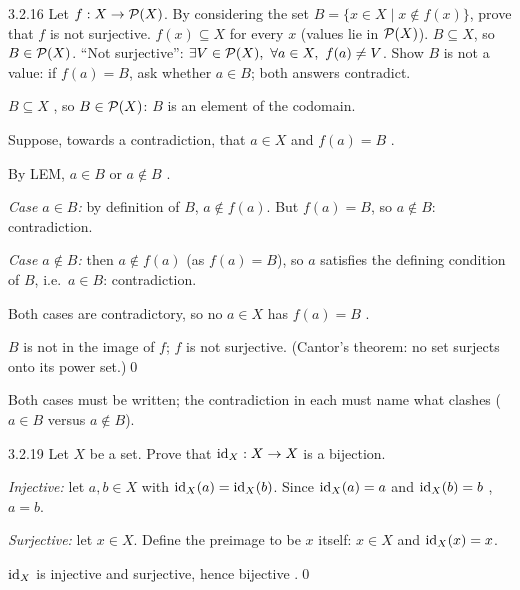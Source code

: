 \begin{bookex}[recommended]{3.2.16}
Let $f:X\to\mathcal{P}(X)$. By considering the set $B=\{x\in X\mid x\notin f(x)\}$, prove that $f$ is not surjective.
\solution
\given $f(x)\subseteq X$ for every $x$ (values lie in $\mathcal{P}(X)$). $B\subseteq X$, so $B\in\mathcal{P}(X)$. ``Not surjective'': $\exists V\in\mathcal{P}(X),\ \forall a\in X,\ f(a)\ne V$.
\plan Show $B$ is not a value: if $f(a)=B$, ask whether $a\in B$; both answers contradict.
\begin{steps}
\item $B\subseteq X$ , so $B\in\mathcal{P}(X)$: $B$ is an element of the codomain.
\item Suppose, towards a contradiction, that $a\in X$ and $f(a)=B$ .
\item By LEM, $a\in B$ or $a\notin B$ .
\item \emph{Case $a\in B$:} by definition of $B$, $a\notin f(a)$. But $f(a)=B$, so $a\notin B$: contradiction.
\item \emph{Case $a\notin B$:} then $a\notin f(a)$ (as $f(a)=B$), so $a$ satisfies the defining condition of $B$, i.e.\ $a\in B$: contradiction.
\item Both cases are contradictory, so no $a\in X$ has $f(a)=B$ .
\end{steps}
\conclusion $B$ is not in the image of $f$; $f$ is not surjective. (Cantor's theorem: no set surjects onto its power set.)\qed
\begin{compare}
\item Both cases must be written; the contradiction in each must name what clashes ($a\in B$ versus $a\notin B$).
\end{compare}
\end{bookex}

\begin{bookex}[recommended]{3.2.19}
Let $X$ be a set. Prove that $\mathrm{id}_X:X\to X$ is a bijection.
\solution
\begin{steps}
\item \emph{Injective:} let $a,b\in X$ with $\mathrm{id}_X(a)=\mathrm{id}_X(b)$. Since $\mathrm{id}_X(a)=a$ and $\mathrm{id}_X(b)=b$ , $a=b$.
\item \emph{Surjective:} let $x\in X$. Define the preimage to be $x$ itself: $x\in X$ and $\mathrm{id}_X(x)=x$.
\end{steps}
\conclusion $\mathrm{id}_X$ is injective and surjective, hence bijective .\qed
\end{bookex}

